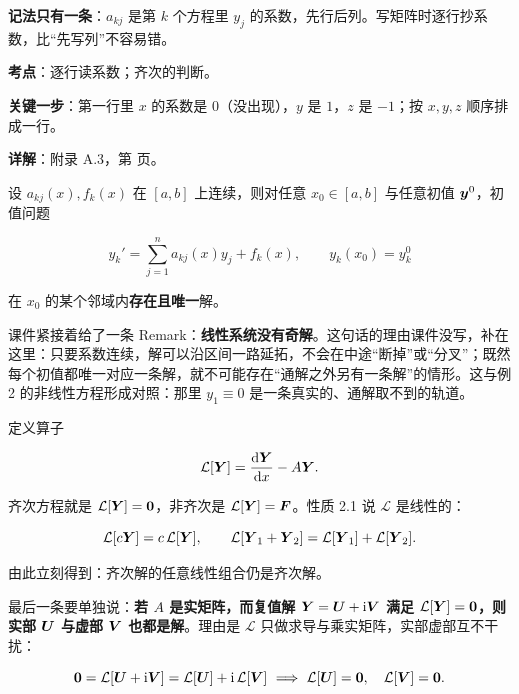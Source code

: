 \documentclass[11pt]{ctexart}
\renewcommand{\qbreak}{\needspace{0.26\textheight}}
\begin{document}
\textbf{记法只有一条}：$a_{kj}$ 是第 $k$ 个方程里 $y_j$ 的系数，先行后列。写矩阵时逐行抄系数，比“先写列”不容易错。


\qbreak
{}
\par\textbf{考点}：逐行读系数；齐次的判断。
\par\textbf{关键一步}：第一行里 $x$ 的系数是 $0$（没出现），$y$ 是 $1$，$z$ 是 $-1$；按 $x,y,z$ 顺序排成一行。
\par\textbf{详解}：附录 A.3，第 \pageref{c1:app:a3} 页。



设 $a_{kj}(x),f_k(x)$ 在 $[a,b]$ 上连续，则对任意 $x_0\in[a,b]$ 与任意初值 $\boldsymbol{y}^0$，初值问题

\[
y_k'=\sum_{j=1}^{n}a_{kj}(x)y_j+f_k(x),\qquad y_k(x_0)=y_k^0
\]

在 $x_0$ 的某个邻域内\textbf{存在且唯一}解。

课件紧接着给了一条 Remark：\textbf{线性系统没有奇解}。这句话的理由课件没写，补在这里：只要系数连续，解可以沿区间一路延拓，不会在中途“断掉”或“分叉”；既然每个初值都唯一对应一条解，就不可能存在“通解之外另有一条解”的情形。这与例 2 的非线性方程形成对照：那里 $y_1\equiv0$ 是一条真实的、通解取不到的轨道。


定义算子

\[
\mathcal{L}[\boldsymbol{Y}]=\frac{\mathrm{d}\boldsymbol{Y}}{\mathrm{d}x}-A\boldsymbol{Y}.
\]

齐次方程就是 $\mathcal{L}[\boldsymbol{Y}]=\boldsymbol{0}$，非齐次是 $\mathcal{L}[\boldsymbol{Y}]=\boldsymbol{F}$。性质 2.1 说 $\mathcal{L}$ 是线性的：

\[
\mathcal{L}[c\boldsymbol{Y}]=c\,\mathcal{L}[\boldsymbol{Y}],\qquad
\mathcal{L}[\boldsymbol{Y}_1+\boldsymbol{Y}_2]=\mathcal{L}[\boldsymbol{Y}_1]+\mathcal{L}[\boldsymbol{Y}_2].
\]

由此立刻得到：齐次解的任意线性组合仍是齐次解。

最后一条要单独说：\textbf{若 $A$ 是实矩阵，而复值解 $\boldsymbol{Y}=\boldsymbol{U}+\mathrm{i}\boldsymbol{V}$ 满足 $\mathcal{L}[\boldsymbol{Y}]=\boldsymbol{0}$，则实部 $\boldsymbol{U}$ 与虚部 $\boldsymbol{V}$ 也都是解}。理由是 $\mathcal{L}$ 只做求导与乘实矩阵，实部虚部互不干扰：

\[
\boldsymbol{0}=\mathcal{L}[\boldsymbol{U}+\mathrm{i}\boldsymbol{V}]=\mathcal{L}[\boldsymbol{U}]+\mathrm{i}\,\mathcal{L}[\boldsymbol{V}]
\ \Longrightarrow\
\mathcal{L}[\boldsymbol{U}]=\boldsymbol{0},\quad \mathcal{L}[\boldsymbol{V}]=\boldsymbol{0}.
\]
\end{document}
